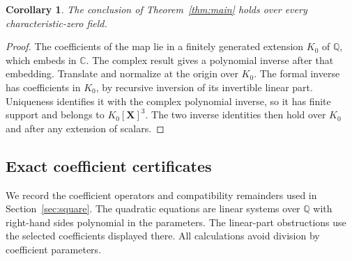 \documentclass[11pt,reqno]{amsart}
\numberwithin{equation}{section}
\theoremstyle{plain}
\newtheorem{corollary}[theorem]{Corollary}
\theoremstyle{definition}
\theoremstyle{remark}
\newcommand{\C}{\mathbb C}
\newcommand{\XX}{\boldsymbol X}
\begin{document}
\begin{corollary}\label{cor:charzero}
The conclusion of Theorem~\ref{thm:main} holds over every characteristic-zero field.
\end{corollary}
\begin{proof}
The coefficients of the map lie in a finitely generated extension $K_0$ of $\mathbb Q$, which embeds in $\C$. The complex result gives a polynomial inverse after that embedding. Translate and normalize at the origin over $K_0$. The formal inverse has coefficients in $K_0$, by recursive inversion of its invertible linear part. Uniqueness identifies it with the complex polynomial inverse, so it has finite support and belongs to $K_0[\XX]^3$. The two inverse identities then hold over $K_0$ and after any extension of scalars.
\end{proof}

\subsection{Exact coefficient certificates}\label{app:certificates}
We record the coefficient operators and compatibility remainders used in
Section~\ref{sec:square}. The quadratic equations are linear systems over
$\mathbb Q$ with right-hand sides polynomial in the parameters. The
linear-part obstructions use the selected coefficients displayed there.
All calculations avoid division by coefficient parameters.
\end{document}
